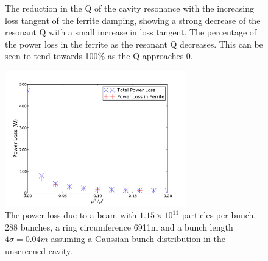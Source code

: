 \begin{figure}
\caption{ The reduction in the Q of the cavity resonance with the increasing loss tangent of the ferrite damping, showing a strong decrease of the resonant Q with a small increase in loss tangent.  The percentage of the power loss in the ferrite as the resonant Q decreases. This can be seen to tend towards 100\% as the Q approaches 0.}
\label{fig:no_screen_res_alterations}
\end{figure}

\begin{figure}
\begin{center}
\includegraphics[width=0.7\textwidth]{Beam_Coupling_Impedance_Reduction_Techniques/figures/no_screen_loss_tan_vs_power.pdf}
\end{center}
\caption{The power loss due to  a beam with $1.15 \times 10^{11}$ particles per bunch, 288 bunches, a ring circumference 6911m and a bunch length $4\sigma = 0.04m$ assuming a Gaussian bunch distribution in the unscreened cavity.}
\label{fig:no_screen_loss_tan_v_power}
\end{figure}


